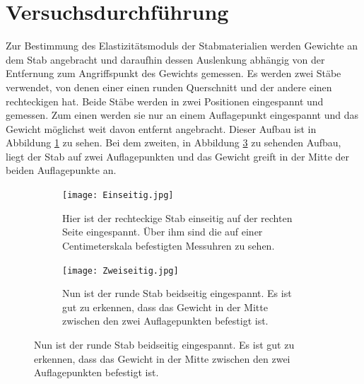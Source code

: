\documentclass[titlepage = firstcover]{scrartcl}
\begin{document}
    \section{Versuchsdurchführung}
      Zur Bestimmung des Elastizitätsmoduls der Stabmaterialien werden Gewichte an dem Stab angebracht und daraufhin dessen Auslenkung abhängig von der Entfernung
      zum Angriffspunkt des Gewichts gemessen. Es werden zwei Stäbe verwendet, von denen einer einen runden Querschnitt und der andere einen rechteckigen hat. Beide
      Stäbe werden in zwei Positionen eingespannt und gemessen. Zum einen werden sie nur an einem Auflagepunkt eingespannt und das Gewicht möglichst weit davon entfernt
      angebracht. Dieser Aufbau ist in Abbildung \ref{fig:fotoEinseitig} zu sehen. Bei dem zweiten, in Abbildung \ref{fig:fotoZweiseitig} zu sehenden Aufbau, liegt der Stab auf zwei Auflagepunkten und das
      Gewicht greift in der Mitte der beiden Auflagepunkte an.\newline

      \begin{figure}[h]
        \centering
        \begin{subfigure}{0.48\textwidth}
          \centering
          \texttt{[image: Einseitig.jpg]}
          \caption{Hier ist der rechteckige Stab einseitig auf der rechten Seite eingespannt. Über ihm sind die auf einer Centimeterskala befestigten Messuhren zu sehen.}
          \label{fig:fotoEinseitig}
        \end{subfigure}
        \begin{subfigure}{0.48\textwidth}
          \centering
          \texttt{[image: Zweiseitig.jpg]}
          \caption{Nun ist der runde Stab beidseitig eingespannt. Es ist gut zu erkennen, dass das Gewicht in der Mitte zwischen den zwei Auflagepunkten befestigt ist. }
          \label{fig:fotoZweiseitig}
        \end{subfigure}
      \end{figure}
\end{document}
